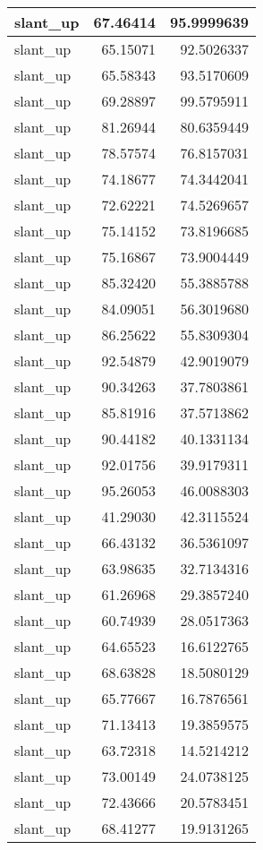 \documentclass[
]{book}
\theoremstyle{definition}
\theoremstyle{definition}
\theoremstyle{definition}
\theoremstyle{definition}
\theoremstyle{remark}
\begin{document}
\begin{tabular}{l|r|r}
\hline
slant\_up & 67.46414 & 95.9999639\\
\hline
slant\_up & 65.15071 & 92.5026337\\
\hline
slant\_up & 65.58343 & 93.5170609\\
\hline
slant\_up & 69.28897 & 99.5795911\\
\hline
slant\_up & 81.26944 & 80.6359449\\
\hline
slant\_up & 78.57574 & 76.8157031\\
\hline
slant\_up & 74.18677 & 74.3442041\\
\hline
slant\_up & 72.62221 & 74.5269657\\
\hline
slant\_up & 75.14152 & 73.8196685\\
\hline
slant\_up & 75.16867 & 73.9004449\\
\hline
slant\_up & 85.32420 & 55.3885788\\
\hline
slant\_up & 84.09051 & 56.3019680\\
\hline
slant\_up & 86.25622 & 55.8309304\\
\hline
slant\_up & 92.54879 & 42.9019079\\
\hline
slant\_up & 90.34263 & 37.7803861\\
\hline
slant\_up & 85.81916 & 37.5713862\\
\hline
slant\_up & 90.44182 & 40.1331134\\
\hline
slant\_up & 92.01756 & 39.9179311\\
\hline
slant\_up & 95.26053 & 46.0088303\\
\hline
slant\_up & 41.29030 & 42.3115524\\
\hline
slant\_up & 66.43132 & 36.5361097\\
\hline
slant\_up & 63.98635 & 32.7134316\\
\hline
slant\_up & 61.26968 & 29.3857240\\
\hline
slant\_up & 60.74939 & 28.0517363\\
\hline
slant\_up & 64.65523 & 16.6122765\\
\hline
slant\_up & 68.63828 & 18.5080129\\
\hline
slant\_up & 65.77667 & 16.7876561\\
\hline
slant\_up & 71.13413 & 19.3859575\\
\hline
slant\_up & 63.72318 & 14.5214212\\
\hline
slant\_up & 73.00149 & 24.0738125\\
\hline
slant\_up & 72.43666 & 20.5783451\\
\hline
slant\_up & 68.41277 & 19.9131265\\

\end{tabular}
\end{document}
